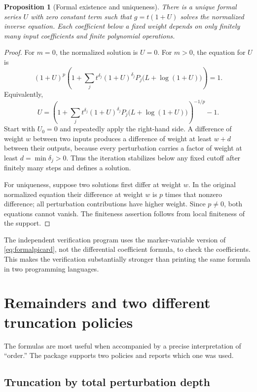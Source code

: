 \documentclass[11pt,a4paper]{article}
\newtheorem{proposition}[theorem]{Proposition}
\theoremstyle{definition}
\theoremstyle{remark}
\begin{document}
\begin{proposition}[Formal existence and uniqueness]\label{prop:formal}
There is a unique formal series $U$ with zero constant term such that
$g=t(1+U)$ solves the normalized inverse equation. Each coefficient below a
fixed weight depends on only finitely many input coefficients and finite
polynomial operations.
\end{proposition}

\begin{proof}
For $m=0$, the normalized solution is $U=0$. For $m>0$, the equation for $U$ is
\[
 (1+U)^p\left(1+\sum_jt^{\delta_j}(1+U)^{\delta_j}
   P_j\bigl(L+\log(1+U)\bigr)\right)=1.
\]
Equivalently,
\begin{equation}\label{eq:formalpicard}
 U=\left(1+\sum_jt^{\delta_j}(1+U)^{\delta_j}
   P_j\bigl(L+\log(1+U)\bigr)\right)^{-1/p}-1.
\end{equation}
Start with $U_0=0$ and repeatedly apply the right-hand side. A difference of
weight $w$ between two inputs produces a difference of weight at least $w+d$
between their outputs, because every perturbation carries a factor of weight
at least $d=\min\delta_j>0$. Thus the iteration stabilizes below any fixed
cutoff after finitely many steps and defines a solution.

For uniqueness, suppose two solutions first differ at weight $w$. In the
original normalized equation their difference at weight $w$ is $p$ times that
nonzero difference; all perturbation contributions have higher weight. Since
$p\ne0$, both equations cannot vanish. The finiteness assertion follows from
local finiteness of the support.
\end{proof}

The independent verification program uses the marker-variable version of
\eqref{eq:formalpicard}, not the differential coefficient formula, to check the
coefficients. This makes the verification substantially stronger than printing
the same formula in two programming languages.

\section{Remainders and two different truncation policies}
\label{sec:remainders}

The formulas are most useful when accompanied by a precise interpretation of
``order.'' The package supports two policies and reports which one was used.

\subsection{Truncation by total perturbation depth}
\end{document}

